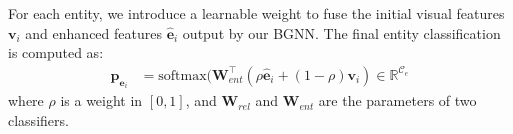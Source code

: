 
For each entity, we introduce a learnable weight to fuse the initial visual features $\mathbf{v}_i$ and enhanced features $\hat{\mathbf{e}}_i$ output by our BGNN. The final entity classification is computed as:
\begin{align}
    \mathbf{p}_{\mathbf{e}_i} &= \text{softmax}(\mathbf{W}_{ent}^\intercal ( \rho\hat{\mathbf{e}}_i + (1-\rho)  \mathbf{v}_i )\in\mathbb{R}^{\mathcal{C}_e} %
\end{align}
where $\rho$ is a weight in $[0,1]$, and $\mathbf{W}_{rel}$ and $\mathbf{W}_{ent}$ are the parameters of two classifiers.


